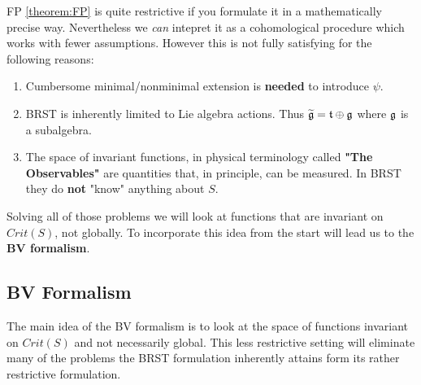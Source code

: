 \begin{rem}
  FP \ref{theorem:FP} is quite restrictive if you formulate it in a mathematically precise way. Nevertheless we \emph{can} intepret it as a cohomological procedure which works with fewer assumptions. However this is not fully satisfying for the following reasons:
  \begin{enumerate}
    \item Cumbersome minimal/nonminimal extension is \textbf{needed} to introduce $\psi$.
    \item BRST is inherently limited to Lie algebra actions. Thus $\widetilde{\mathfrak{g}} = \mathfrak{t} \oplus \mathfrak{g}$ where $\mathfrak{g}$ is a subalgebra.
    \item The space of invariant functions, in physical terminology called \textbf{"The Observables"} are quantities that, in principle, can be measured. In BRST they do \textbf{not} "know" anything about $S$.
  \end{enumerate}

  Solving all of those problems we will look at functions that are invariant on $Crit(S)$, not globally. To incorporate this idea from the start will lead us to the \textbf{BV formalism}.
\end{rem}


\subsection{BV Formalism}
\label{subsec:BVFormalism}

The main idea of the BV formalism is to look at the space of functions invariant on $Crit(S)$ and not necessarily global. This less restrictive setting will eliminate many of the problems the BRST formulation inherently attains form its rather restrictive formulation.

